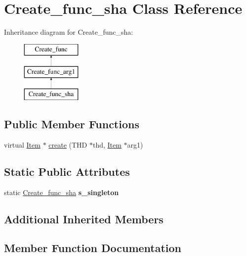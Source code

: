 \hypertarget{classCreate__func__sha}{}\section{Create\+\_\+func\+\_\+sha Class Reference}
\label{classCreate__func__sha}
Inheritance diagram for Create\+\_\+func\+\_\+sha\+:\begin{figure}[H]
\begin{center}
\leavevmode
\includegraphics[height=3.000000cm]{classCreate__func__sha}
\end{center}
\end{figure}
\subsection*{Public Member Functions}
\begin{DoxyCompactItemize}
\item 
virtual \mbox{\hyperlink{classItem}{Item}} $\ast$ \mbox{\hyperlink{classCreate__func__sha_a973e26de3fb8ce67514fb91faeef6759}{create}} (T\+HD $\ast$thd, \mbox{\hyperlink{classItem}{Item}} $\ast$arg1)
\end{DoxyCompactItemize}
\subsection*{Static Public Attributes}
\begin{DoxyCompactItemize}
\item 
\mbox{\label{classCreate__func__sha_ac57aaf54290c8f0b44620568e69ecf4c}} 
static \mbox{\hyperlink{classCreate__func__sha}{Create\+\_\+func\+\_\+sha}} {\bfseries s\+\_\+singleton}
\end{DoxyCompactItemize}
\subsection*{Additional Inherited Members}


\subsection{Member Function Documentation}
\mbox{\label{classCreate__func__sha_a973e26de3fb8ce67514fb91faeef6759}} 
